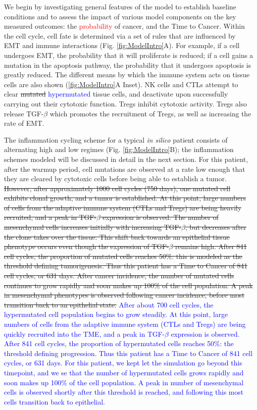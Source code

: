 \documentclass[11pt]{article}
\newcommand{\tcr} { \textcolor{red} }
\newcommand{\tcb} { \textcolor{blue} }
\begin{document}
We begin by investigating general features of the model to establish baseline conditions and to assess the impact of various model components on the key measured outcomes: the \tcr{probability} of cancer, and the Time to Cancer. 
Within the cell cycle, cell fate is determined via a set of rules that are influenced by EMT and immune interactions (Fig. \ref{fig:ModelIntro}A). For example, if a cell undergoes EMT, the probability that it will proliferate is reduced; if a cell gains a mutation in the apoptosis pathway, the probability that it undergoes apoptosis is greatly reduced.
The different means by which the immune system acts on tissue cells are also shown (\ref{fig:ModelIntro}A Inset). NK cells and CTLs attempt to clear \sout{mutated} \tcb{hypermutated} tissue cells, and deactivate upon successfully carrying out their cytotoxic function.
Tregs inhibit cytotoxic activity.
Tregs also release TGF-$\beta$ which promotes the recruitment of Tregs, as well as increasing the rate of EMT.
\par
The inflammation cycling scheme for a typical {\it in silico} patient consists of alternating high and low regimes (Fig. \ref{fig:ModelIntro}B); the inflammation schemes modeled will be discussed in detail in the next section.
For this patient, after the warmup period, cell mutations are observed at a rate low enough that they are cleared by cytotoxic cells before being able to establish a tumor.
\sout{
However, after approximately 1000 cell cycles (750 days), one mutated cell exhibits clonal growth, and a tumor is established.
At this point, large numbers of cells from the adaptive immune system (CTLs and Tregs) are being heavily recruited, and a peak in TGF-$\beta$ expression is observed.
The number of mesenchymal cells increases initially with increasing TGF-$\beta$, but decreases after the clone takes over the tissue.
This shift back towards an epithelial tissue phenotype occurs even though the expression of TGF-$\beta$ remains high.
After 841 cell cycles, the proportion of mutated cells reaches 50\%: this is modeled as the threshold defining tumorigenesis. Thus this patient has a Time to Cancer of 841 cell cycles, or 631 days. 
After cancer incidence, the number of mutated cells continues to grow rapidly and soon makes up 100\% of the cell population. A peak in mesenchymal phenotypes is observed following cancer incidence, before most transition back to an epithelial state.}
\tcb{
After about 700 cell cycles, the hypermutated cell population begins to grow steadily.
At this point, large numbers of cells from the adaptive immune system (CTLs and Tregs) are being quickly recruited into the TME, and a peak in TGF-$\beta$ expression is observed.
After 841 cell cycles, the proportion of hypermutated cells reaches 50\%: the threshold defining progression.
Thus this patient has a Time to Cancer of 841 cell cycles, or 631 days.
For this patient, we kept let the simulation go beyond this timepoint, and we se that the number of hypermutated cells grows rapidly and soon makes up 100\% of the cell population.
A peak in number of mesenchymal cells is observed shortly after this threshold is reached, and following this most cells transition back to epithelial.
}
\end{document}
